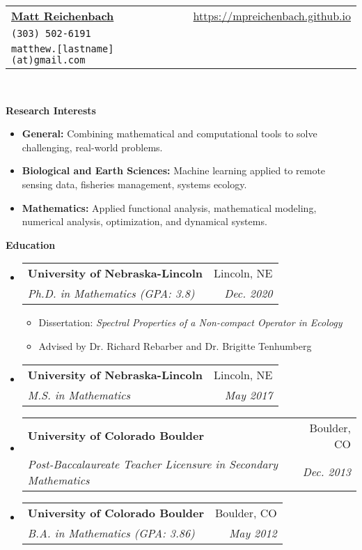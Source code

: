 \documentclass[letterpaper,11pt]{article}
\makeatletter
\newcommand{\resitem}[1]{\item #1 \vspace{-2pt}}
\newcommand{\resheading}[1]{{\large \colorbox{mygrey}{\begin{minipage}{\textwidth}{\textbf{#1 \vphantom{p\^{E}}}}\end{minipage}}}}
\newcommand{\ressubheading}[4]{
\begin{tabular*}{6.5in}{l@{\extracolsep{\fill}}r}
		\textbf{#1} & #2 \\
		\textit{#3} & \textit{#4} \\
\end{tabular*}\vspace{-6pt}}
\makeatother
\begin{document}
\thispagestyle{empty}
\newcommand{\mywebheader}{
\begin{tabular*}{7in}{l@{\extracolsep{\fill}}r}
	\textbf{\href{}{\LARGE Matt Reichenbach}} & \url{https://mpreichenbach.github.io} \\
    \texttt{(303) 502-6191} \\
    \texttt{matthew.[lastname](at)gmail.com} \\
	\end{tabular*}
\\
\vspace{0.1in}}

\mywebheader

\resheading{Research Interests}
\begin{itemize}
	\resitem{\textbf{General:} Combining mathematical and computational tools to solve challenging, real-world problems.}
	
	\resitem{\textbf{Biological and Earth Sciences:} Machine learning applied to remote sensing data, fisheries management, systems ecology.}
	
	\resitem{\textbf{Mathematics:} Applied functional analysis, mathematical modeling, numerical analysis, optimization, and dynamical systems.}
	
	
\end{itemize}

\resheading{Education}
	\begin{itemize}
		\item
			\ressubheading{University of Nebraska-Lincoln}{Lincoln, NE}{Ph.D. in Mathematics (GPA: 3.8)}{Dec. 2020}
				{ \footnotesize
				\begin{itemize}
					\resitem{Dissertation: \emph{Spectral Properties of a Non-compact Operator in Ecology}}
					\resitem{Advised by Dr. Richard Rebarber and Dr. Brigitte Tenhumberg}
				\end{itemize}}
		\item
		    	\ressubheading{University of Nebraska-Lincoln}{Lincoln, NE}{M.S. in Mathematics}{May 2017}
		\item
			\ressubheading{University of Colorado Boulder}{Boulder, CO}{Post-Baccalaureate Teacher Licensure in Secondary Mathematics}{Dec. 2013}
		\item
			\ressubheading{University of Colorado Boulder}{Boulder, CO}{B.A. in Mathematics (GPA: 3.86)}{May 2012}
			
	\end{itemize}
\end{document}
